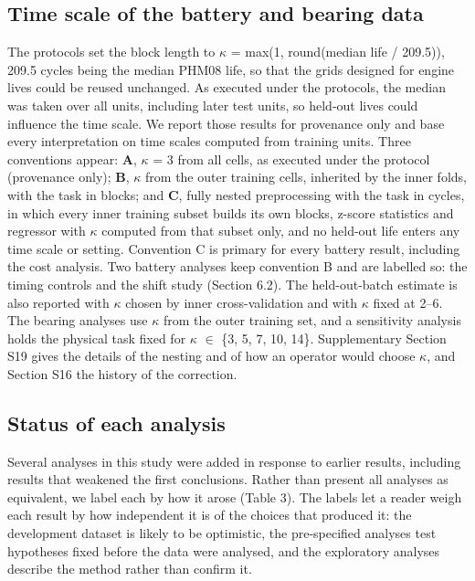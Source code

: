 \documentclass[a4paper,fleqn,doubleblind]{cas-dc}
\begin{document}
\subsection{Time scale of the battery and bearing data}

The protocols set the block length to $\kappa$ = max(1, round(median life / 209.5)), 209.5 cycles being the median PHM08 life, so that the grids designed for engine lives could be reused unchanged. As executed under the protocols, the median was taken over all units, including later test units, so held-out lives could influence the time scale. We report those results for provenance only and base every interpretation on time scales computed from training units. Three conventions appear: \textbf{A}, $\kappa$ = 3 from all cells, as executed under the protocol (provenance only); \textbf{B}, $\kappa$ from the outer training cells, inherited by the inner folds, with the task in blocks; and \textbf{C}, fully nested preprocessing with the task in cycles, in which every inner training subset builds its own blocks, z-score statistics and regressor with $\kappa$ computed from that subset only, and no held-out life enters any time scale or setting. Convention C is primary for every battery result, including the cost analysis. Two battery analyses keep convention B and are labelled so: the timing controls and the shift study (Section 6.2). The held-out-batch estimate is also reported with $\kappa$ chosen by inner cross-validation and with $\kappa$ fixed at 2--6. The bearing analyses use $\kappa$ from the outer training set, and a sensitivity analysis holds the physical task fixed for $\kappa$ $\in$ \{3, 5, 7, 10, 14\}. Supplementary Section S19 gives the details of the nesting and of how an operator would choose $\kappa$, and Section S16 the history of the correction.

\subsection{Status of each analysis}

Several analyses in this study were added in response to earlier results, including results that weakened the first conclusions. Rather than present all analyses as equivalent, we label each by how it arose (Table 3). The labels let a reader weigh each result by how independent it is of the choices that produced it: the development dataset is likely to be optimistic, the pre-specified analyses test hypotheses fixed before the data were analysed, and the exploratory analyses describe the method rather than confirm it.
\end{document}
